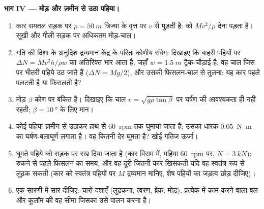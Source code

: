 \begin{problem}
\medskip
\noindent\textbf{भाग IV --- मोड़ और ज़मीन से उठा पहिया।}
\begin{enumerate}[resume]
  \item कार समतल सड़क पर
        $\rho = \qty{50}{m}$ त्रिज्या के वृत्त पर $v$ से मुड़ती है:
         को $Mv^2/\rho$ देना पड़ता है। सूखी और गीली सड़क पर
        अधिकतम मोड़-चाल।
  \item गति की दिशा के अनुदिश द्रव्यमान केंद्र के परितः कोणीय संवेग:
        दिखाइए कि बाहरी पहियों पर $\Delta N =
        Mv^2h/\rho w$ का अतिरिक्त भार आता है, जहाँ $w = \qty{1.5}{m}$
        ट्रैक-चौड़ाई है; वह चाल जिस पर भीतरी पहिये उठ जाते हैं
        ($\Delta N = Mg/2$), और उसकी फिसलन-चाल से तुलना: यह कार पहले
        पलटती है या फिसलती है?
  \item मोड़ $\beta$ कोण पर बंकित है। दिखाइए कि चाल
        $v = \sqrt{g\rho\tan\beta}$ पर घर्षण की आवश्यकता ही नहीं रहती;
        $\beta = \qty{10}{\degree}$ के लिए मान।
  \item कोई पहिया ज़मीन से उठाकर हाथ से \qty{60}{rpm} तक
        घुमाया जाता है; उसका धारक \qty{0.05}{N.m} का घर्षण-बलाघूर्ण
        लगाता है। वह कितनी देर घूमता है? खोई गतिज ऊर्जा।
  \item घूमते पहिये को सड़क पर रख दिया जाता है (कार विराम में, पहिया
        \qty{60}{rpm} पर, $N = \qty{3}{kN}$): रुकने से पहले फिसलन का समय,
        और वह दूरी जितनी कार खिसकती यदि वह स्वतंत्र रूप से लुढ़क
        सकती (कार को स्वतंत्र पहियों पर $M$ द्रव्यमान मानिए, शेष
        पहियों का जड़त्व छोड़ दीजिए)।
  \item एक सारणी में सार दीजिए: चारों दशाएँ (लुढ़कना, त्वरण,
        ब्रेक, मोड़), प्रत्येक में काम करने वाला बल और
        कूलॉम की वह सीमा जिसका उसे पालन करना है।
\end{enumerate}
\end{problem}

